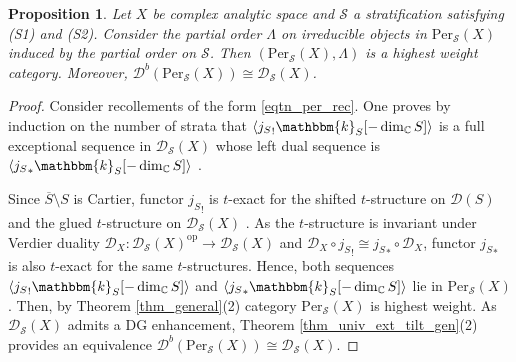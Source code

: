 \documentclass[12pt,a4paper]{amsart}
\newcommand{\dD}{{\mathcal{D}}}
\newcommand{\kk}{\mathbbm{k}}
\newcommand{\tr}{{\mbox{$t$-struc}\-tu\-r}}
\newcommand{\opp}{\mathop{\textrm{op}}\nolimits}
\newcommand{\ol}[1]{\overline{#1}}
\newtheorem{PROP}[LEM]{Proposition}
\theoremstyle{definition}
\begin{document}
\begin{PROP}\cite{MirVil, ParSco}
	Let $X$ be complex analytic space and $\mathscr{S}$  a stratification satisfying (S1) and (S2). Consider the partial order $\Lambda$ on irreducible objects in  $\textrm{Per}_{\mathscr{S}}(X)$  induced by the partial order on  $\mathscr{S}$. Then $(\textrm{Per}_{\mathscr{S}}(X), \Lambda)$ %
	is a highest weight category. Moreover, $\dD^b(\textrm{Per}_{\mathscr{S}}(X)) \cong \dD_{\mathscr{S}}(X)$.
\end{PROP}
\begin{proof}
	Consider recollements of the form \eqref{eqtn_per_rec}.
	One proves by induction on the number of strata  that $\langle {j_S}_! \kk_S [-\dim_{\mathbb{C}}S] \rangle$ is a full exceptional sequence in $\dD_{\mathscr{S}}(X)$ whose left dual sequence is $\langle {j_S}_* \kk_S [-\dim_{\mathbb{C}}S] \rangle$ . 
	
	Since $\ol{S}\setminus S$ is Cartier, functor ${j_S}_!$ is $t$-exact for the shifted \tr e on $\dD(S)$ and the glued \tr e on $\dD_{\mathscr{S}}(X)$ \cite[Lemma 3.1]{MirVil}. As the \tr e is invariant under Verdier duality $\mathscr{D}_X\colon \dD_{\mathscr{S}}(X)^{\opp}\to \dD_{\mathscr{S}}(X)$ and $\mathscr{D}_X \circ {j_S}_!\cong {j_S}_*\circ \mathscr{D}_X$, functor ${j_S}_*$ is also $t$-exact for the same \tr es. 
	Hence, both sequences  $\langle {j_S}_!\kk_{S}[-\dim_{\mathbb{C}}S]\rangle$ and $\langle {j_S}_*\kk_{S}[-\dim_{\mathbb{C}}S]\rangle$ lie in $\textrm{Per}_{\mathscr{S}}(X)$.
	 Then, by Theorem \ref{thm_general}(2) category $\textrm{Per}_{\mathscr{S}}(X)$ is highest weight. As $\dD_{\mathscr{S}}(X)$ admits a DG enhancement, Theorem \ref{thm_univ_ext_tilt_gen}(2) provides an equivalence $\dD^b(\textrm{Per}_{\mathscr{S}}(X)) \cong \dD_{\mathscr{S}}(X)$.
\end{proof}
\end{document}

